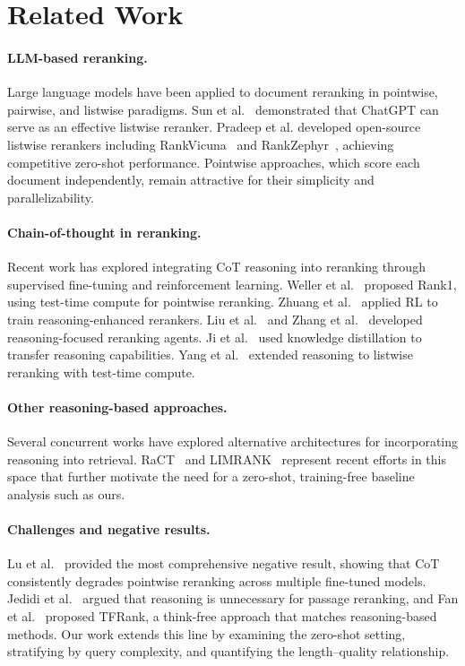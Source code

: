 \documentclass[sigconf,review]{acmart}
\begin{document}
\section{Related Work}

\paragraph{LLM-based reranking.}
Large language models have been applied to document reranking in pointwise, pairwise, and listwise paradigms. Sun et al.~\cite{sun2023chatgpt} demonstrated that ChatGPT can serve as an effective listwise reranker. Pradeep et al. developed open-source listwise rerankers including RankVicuna~\cite{pradeep2023rankvicuna} and RankZephyr~\cite{pradeep2023rankzephyr}, achieving competitive zero-shot performance. Pointwise approaches, which score each document independently, remain attractive for their simplicity and parallelizability.

\paragraph{Chain-of-thought in reranking.}
Recent work has explored integrating CoT reasoning into reranking through supervised fine-tuning and reinforcement learning. Weller et al.~\cite{weller2025rank1} proposed Rank1, using test-time compute for pointwise reranking. Zhuang et al.~\cite{zhuang2025rankr1} applied RL to train reasoning-enhanced rerankers. Liu et al.~\cite{liu2025reasonrank} and Zhang et al.~\cite{zhang2025rearank} developed reasoning-focused reranking agents. Ji et al.~\cite{ji2025reasoningrank} used knowledge distillation to transfer reasoning capabilities. Yang et al.~\cite{yang2025rankk} extended reasoning to listwise reranking with test-time compute.

\paragraph{Other reasoning-based approaches.}
Several concurrent works have explored alternative architectures for incorporating reasoning into retrieval. RaCT~\cite{ract2024} and LIMRANK~\cite{limrank2025} represent recent efforts in this space that further motivate the need for a zero-shot, training-free baseline analysis such as ours.

\paragraph{Challenges and negative results.}
Lu et al.~\cite{lu2025rethinking} provided the most comprehensive negative result, showing that CoT consistently degrades pointwise reranking across multiple fine-tuned models. Jedidi et al.~\cite{jedidi2025dont} argued that reasoning is unnecessary for passage reranking, and Fan et al.~\cite{fan2025tfrank} proposed TFRank, a think-free approach that matches reasoning-based methods. Our work extends this line by examining the zero-shot setting, stratifying by query complexity, and quantifying the length--quality relationship.
\end{document}
